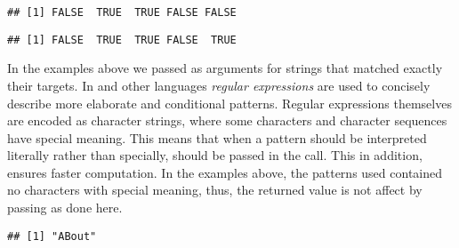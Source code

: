 \documentclass[krantz2]{krantz}\usepackage{knitr}
\begin{document}
\begin{knitrout}\footnotesize
{}\color{fgcolor}\begin{kframe}
\begin{alltt}
\hlstd{(} \hlstd{=} \hlstd{,}  \hlstd{=} \hlstd{(}\hlstd{,} \hlstd{,} \hlstd{,} \hlstd{,} \hlstd{))}
\end{alltt}
\begin{verbatim}
## [1] FALSE  TRUE  TRUE FALSE FALSE
\end{verbatim}
\begin{alltt}
\hlstd{(} \hlstd{=} \hlstd{,}  \hlstd{=} \hlstd{(}\hlstd{,} \hlstd{,} \hlstd{,} \hlstd{,} \hlstd{),}  \hlstd{=} \hlstd{)}
\end{alltt}
\begin{verbatim}
## [1] FALSE  TRUE  TRUE FALSE  TRUE
\end{verbatim}
\end{kframe}
\end{knitrout}

%
In the examples above we passed as arguments for  strings that matched exactly their targets. In \Rlang and other languages \emph{regular expressions} are used to concisely describe more elaborate and conditional patterns. Regular expressions themselves are encoded as character strings, where some characters and character sequences have special meaning. This means that when a pattern should be interpreted literally rather than specially,  should be passed in the call. This in addition, ensures faster computation. In the examples above, the patterns used contained no characters with special meaning, thus, the returned value is not affect by passing  as done here.

\begin{knitrout}\footnotesize
{}\color{fgcolor}\begin{kframe}
\begin{alltt}
\hlstd{(} \hlstd{=} \hlstd{,}  \hlstd{=} \hlstd{,}  \hlstd{=} \hlstd{,}  \hlstd{=} \hlstd{)}
\end{alltt}
\begin{verbatim}
## [1] "ABout"
\end{verbatim}
\end{kframe}
\end{knitrout}
\end{document}
